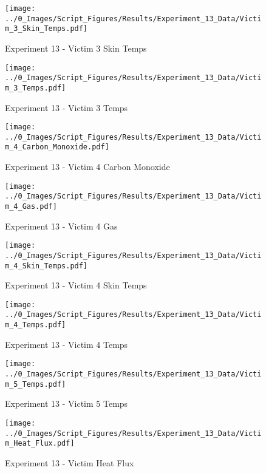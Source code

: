 	\clearpage

	\begin{figure}[H]
		\centering
		\texttt{[image: ../0\_Images/Script\_Figures/Results/Experiment\_13\_Data/Victim\_3\_Skin\_Temps.pdf]}
		\caption[]{Experiment 13 - Victim 3 Skin Temps}
	\end{figure}
 

	\begin{figure}[H]
		\centering
		\texttt{[image: ../0\_Images/Script\_Figures/Results/Experiment\_13\_Data/Victim\_3\_Temps.pdf]}
		\caption[]{Experiment 13 - Victim 3 Temps}
	\end{figure}
 
	\clearpage

	\begin{figure}[H]
		\centering
		\texttt{[image: ../0\_Images/Script\_Figures/Results/Experiment\_13\_Data/Victim\_4\_Carbon\_Monoxide.pdf]}
		\caption[]{Experiment 13 - Victim 4 Carbon Monoxide}
	\end{figure}
 

	\begin{figure}[H]
		\centering
		\texttt{[image: ../0\_Images/Script\_Figures/Results/Experiment\_13\_Data/Victim\_4\_Gas.pdf]}
		\caption[]{Experiment 13 - Victim 4 Gas}
	\end{figure}
 
	\clearpage

	\begin{figure}[H]
		\centering
		\texttt{[image: ../0\_Images/Script\_Figures/Results/Experiment\_13\_Data/Victim\_4\_Skin\_Temps.pdf]}
		\caption[]{Experiment 13 - Victim 4 Skin Temps}
	\end{figure}
 

	\begin{figure}[H]
		\centering
		\texttt{[image: ../0\_Images/Script\_Figures/Results/Experiment\_13\_Data/Victim\_4\_Temps.pdf]}
		\caption[]{Experiment 13 - Victim 4 Temps}
	\end{figure}
 
	\clearpage

	\begin{figure}[H]
		\centering
		\texttt{[image: ../0\_Images/Script\_Figures/Results/Experiment\_13\_Data/Victim\_5\_Temps.pdf]}
		\caption[]{Experiment 13 - Victim 5 Temps}
	\end{figure}
 

	\begin{figure}[H]
		\centering
		\texttt{[image: ../0\_Images/Script\_Figures/Results/Experiment\_13\_Data/Victim\_Heat\_Flux.pdf]}
		\caption[]{Experiment 13 - Victim Heat Flux}
	\end{figure}
 
